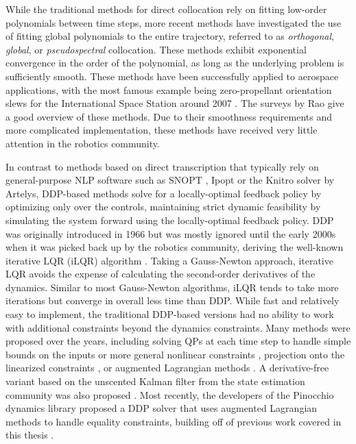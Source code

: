 \documentclass[../root.tex]{subfiles}
\begin{document}
While the traditional methods for direct collocation rely on fitting
low-order polynomials between time steps, more recent methods have
investigated the use of fitting global polynomials to the entire trajectory,
referred to as \textit{orthogonal}, \textit{global}, or
\textit{pseudospectral} collocation. These methods exhibit exponential
convergence in the order of the polynomial, as long as the underlying problem
is sufficiently smooth. These methods have been successfully applied to
aerospace applications, with the most famous example being zero-propellant
orientation slews for the International Space Station around 2007
\cite{kang_Pseudospectral_2007}. The surveys by Rao
\cite{rao_Survey_,rao_Trajectory_2014} give a good overview of these methods.
Due to their smoothness requirements and more complicated implementation,
these methods have received very little attention in the robotics community.

In contrast to methods based on direct transcription that typically rely on
general-purpose NLP software such as SNOPT \cite{gill_SNOPT_2005}, Ipopt
\cite{wachter_implementation_2006} or the Knitro solver by Artelys, DDP-based
methods solve for a locally-optimal feedback policy by optimizing only over
the controls, maintaining strict dynamic feasibility by simulating the system
forward using the locally-optimal feedback policy. DDP was originally
introduced in 1966 \cite{mayne_Secondorder_1966} but was mostly ignored until
the early 2000s when it was picked back up by the robotics community,
deriving the well-known iterative LQR (iLQR) algorithm
\cite{todorov_generalized_2005}. Taking a Gauss-Newton approach, iterative
LQR avoids the expense of calculating the second-order derivatives of the
dynamics. Similar to most Gauss-Newton algorithms, iLQR tends to take more
iterations but converge in overall less time than DDP. While fast and
relatively easy to implement, the traditional DDP-based versions had no
ability to work with additional constraints beyond the dynamics constraints.
Many methods were proposed over the years, including solving QPs at each time
step to handle simple bounds on the inputs \cite{tassa_Controllimited_2014}
or more general nonlinear constraints \cite{xie_Differential_2017},
projection onto the linearized constraints \cite{giftthaler_projection_2017},
or augmented Lagrangian methods \cite{plancher_Constrained_2017}. A
derivative-free variant based on the unscented Kalman filter from the state
estimation community was also proposed \cite{manchester_DerivativeFree_2016}.
Most recently, the developers of the Pinocchio dynamics library
\cite{carpentier_Pinocchio_2019} proposed a DDP solver that uses augmented Lagrangian
methods to handle equality constraints, building off of previous work covered
in this thesis \cite{kazdadi_Equality_2021}.
\end{document}

